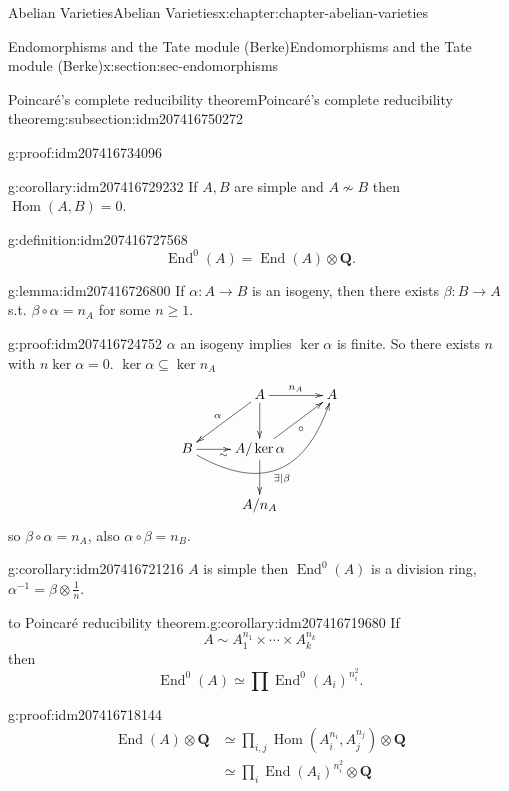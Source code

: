 \documentclass[oneside,10pt,]{book}
\numberwithin{equation}{section}
\newcommand{\QQ}{\mathbf{Q}}
\DeclareMathOperator{\End}{End}
\DeclareMathOperator{\Hom}{Hom}
\newcommand{\amp}{&}
\begin{document}
\begin{chapterptx}{Abelian Varieties}{}{Abelian Varieties}{}{}{x:chapter:chapter-abelian-varieties}
\begin{sectionptx}{Endomorphisms and the Tate module (Berke)}{}{Endomorphisms and the Tate module (Berke)}{}{}{x:section:sec-endomorphisms}
\begin{subsectionptx}{Poincaré's complete reducibility theorem}{}{Poincaré's complete reducibility theorem}{}{}{g:subsection:idm207416750272}
\begin{proofptx}{}{g:proof:idm207416734096}
\end{proofptx}
\begin{corollary}{}{}{g:corollary:idm207416729232}%
If \(A,B\) are simple and  \(A\not\sim B\) then \(\Hom(A,B) = 0\).%
\end{corollary}
\begin{definition}{}{g:definition:idm207416727568}%
%
\begin{equation*}
\End^0(A) = \End(A) \otimes \QQ\text{.}
\end{equation*}
%
\end{definition}
\begin{lemma}{}{}{g:lemma:idm207416726800}%
If \(\alpha \colon A\to B\) is an isogeny, then there exists \(\beta \colon B\to A\) s.t. \(\beta \circ \alpha = n_A\) for some \(n \ge 1\).%
\end{lemma}
\begin{proofptx}{}{g:proof:idm207416724752}
\(\alpha\) an isogeny implies \(\ker \alpha\) is finite. So there exists \(n\) with \(n \ker \alpha = 0\). \(\ker\alpha \subseteq \ker n_A\)%
\begin{equation*}
\xymatrix{
& A \ar[dl]_\alpha \ar[d]\ar[r]^{n_A} & A \\
B\ar[r]_\sim \ar@/_3.0pc/[urr]_{\exists | \beta} & A/\ker\alpha \ar[d]\ar[ur]_{\circ} &\\
& A/n_A &
}
\end{equation*}
so \(\beta\circ \alpha = n_A\), also \(\alpha \circ \beta = n_B\).%
\end{proofptx}
\begin{corollary}{}{}{g:corollary:idm207416721216}%
\(A\) is simple then \(\End^0(A)\) is a division ring, \(\alpha^{-1} = \beta \otimes \frac 1n\).%
\end{corollary}
\begin{corollary}{to Poincaré reducibility theorem.}{}{g:corollary:idm207416719680}%
If%
\begin{equation*}
A\sim A_1^{n_1} \times \cdots \times A_k^{n_k}
\end{equation*}
then%
\begin{equation*}
\End^0(A) \simeq \prod \End^0(A_i)^{n_i^2}\text{.}
\end{equation*}
%
\end{corollary}
\begin{proofptx}{}{g:proof:idm207416718144}
%
\begin{align*}
\End(A) \otimes \QQ \amp \simeq \prod_{i,j} \Hom(A_i^{n_i}, A_j^{n_j}) \otimes \QQ\\
\amp \simeq \prod_{i} \End(A_i)^{n_i^2} \otimes \QQ\\

\end{align*}
\end{proofptx}
\end{subsectionptx}
\end{sectionptx}
\end{chapterptx}
\end{document}
